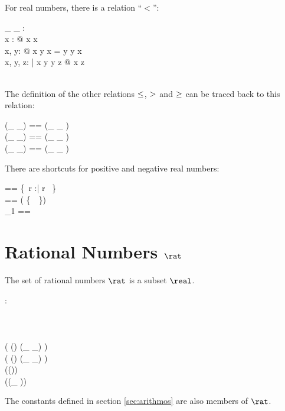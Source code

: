 \documentclass[12pt]{article}
\begin{document}
For real numbers, there is a relation ``$<$'':
%
\begin{axdef}
  \_ \alt \_ : \real \rel \real\\
  \where
  \forall x : \real @ \lnot x \alt x\\
  \forall x, y: \real @ x \alt y \lor x = y \lor y \alt x\\
  \forall x, y, z: \real | x \alt y \land y \alt z @ x \alt z \\
  \azero \alt \aone\\
\end{axdef}
%
The definition of the other relations $\leq$, $>$ and $\geq$ can
be traced back to this relation:
%
\begin{zed}
  (\_ \aleq \_) == (\_ \alt \_ ) \cup \id \real \\
  (\_ \agt \_) == (\_ \alt \_ ) \inv \\
  (\_ \ageq \_) == (\_ \agt \_ ) \cup \id \real \\
\end{zed}
%
There are shortcuts for positive and negative real numbers:
%
\begin{zed}
  \realplus == \{~r :\real | r \agt \azero~\}\\
  \realminus == \real \setminus ( \realplus \cup \{~\azero~\})\\
  \real_1 == \realplus \cup \realminus \\
\end{zed}
%
%

\section{Rational Numbers $\rat$}
\label{sec:rational-numbers}
The set of rational numbers $\rat$ is a subset $\real$.
%
\begin{axdef}
  \rat : \power \real
  \where
  \azero \in \rat\\
  \aone \in \rat\\
  \atwo \in \rat\\
  \aten \in \rat\\
  \ran ( (\rat \cross \rat) \dres (\_ \aplus \_) ) \subset \rat\\
  \ran ( (\rat \cross \rat) \dres (\_ \amult \_) ) \subset \rat\\
  \ran (\rat \dres (\aneg ))  \subset \rat\\
  \ran (\rat \dres (\_ \ainv ))  \subset \rat\\
\end{axdef}
The constants defined in section \ref{sec:arithmos} are also members
of $\rat$.
\end{document}
